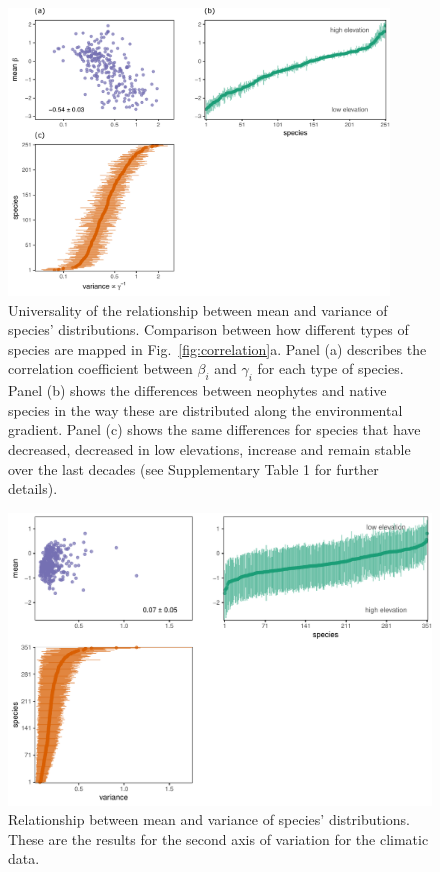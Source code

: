 \documentclass[11pt, a4paper]{article}
\begin{document}
\begin{figure}[h]
  \centering
    \includegraphics[width=0.9\textwidth]{figures/categorical-figure1}
    	  \vspace{0.1cm}
	   \caption{Universality of the relationship between mean and variance of species' distributions. Comparison between how different types of species are mapped in Fig.~\ref{fig:correlation}a. Panel (a) describes the correlation coefficient between $\beta_i$ and $\gamma_i$ for each type of species. Panel (b) shows the differences between neophytes and native species in the way these are distributed along the environmental gradient. Panel (c) shows the same differences for species that have decreased, decreased in low elevations, increase and remain stable over the last decades (see Supplementary Table 1 for further details).}
      \label{sfig:categorical-baseline}
\end{figure}

\clearpage

\begin{figure}[h]
  \centering
    \vspace{0.5cm}
    \includegraphics[width=1\textwidth]{figures/figure1-secondaxis}
    	  \vspace{0.3cm}
	   \caption{Relationship between mean and variance of species' distributions. These are the results for the second axis of variation for the climatic data.}
      \label{sfig:sensitivity}
\end{figure}
\end{document}
